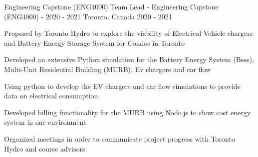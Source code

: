 \begin{cventries}
\cventry
{Engineering Capstone (ENG4000)} %
{Team Lead - Engineering Capstone (ENG4000) - 2020 - 2021} %
{Toronto, Canada} %
{2020 - 2021} %
{ %
\begin{cvitems}
\item {Proposed by Toronto Hydro to explore the viability of Electrical Vehicle chargers and Battery Energy Storage System for Condos in Toronto}
\item {Developed an extensive Python simulation for the Battery Energy System (Bess), Multi-Unit Residential Building (MURB), Ev chargers and car flow}
\item {Using python to develop the EV chargers and car flow simulations to provide data on electrical consumption}
\item {Developed billing functionality for the MURB using Node.js  to show cost energy system in one environment}
\item {Organized meetings in order to communicate project progress with Toronto Hydro and course advisors}
\end{cvitems}
}



\end{cventries}